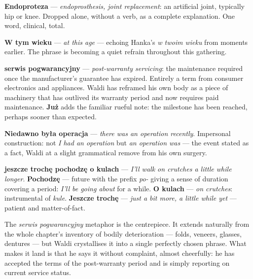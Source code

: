 
\textbf{Endoproteza} --- \textit{endoprosthesis, joint replacement}: an
artificial joint, typically hip or knee. Dropped alone, without a verb,
as a complete explanation. One word, clinical, total.

\textbf{W tym wieku} --- \textit{at this age} --- echoing Hanka's
\textit{w twoim wieku} from moments earlier. The phrase is becoming a
quiet refrain throughout this gathering.

\textbf{serwis pogwarancyjny} --- \textit{post-warranty servicing}: the
maintenance required once the manufacturer's guarantee has expired.
Entirely a term from consumer electronics and appliances. Waldi has
reframed his own body as a piece of machinery that has outlived its
warranty period and now requires paid maintenance. \textbf{Już} adds
the familiar rueful note: the milestone has been reached, perhaps
sooner than expected.

\textbf{Niedawno była operacja} --- \textit{there was an operation
recently}. Impersonal construction: not \textit{I had an operation} but
\textit{an operation was} --- the event stated as a fact, Waldi at a
slight grammatical remove from his own surgery.

\textbf{jeszcze trochę pochodzę o kulach} --- \textit{I'll walk on
crutches a little while longer}. \textbf{Pochodzę} --- future with the
prefix \textit{po-} giving a sense of duration covering a period:
\textit{I'll be going about} for a while. \textbf{O kulach} ---
\textit{on crutches}: instrumental of \textit{kule}. \textbf{Jeszcze
trochę} --- \textit{just a bit more, a little while yet} --- patient
and matter-of-fact.

The \textit{serwis pogwarancyjny} metaphor is the centrepiece. It
extends naturally from the whole chapter's inventory of bodily
deterioration --- folds, veneers, glasses, dentures --- but Waldi
crystallises it into a single perfectly chosen phrase. What makes it
land is that he says it without complaint, almost cheerfully: he has
accepted the terms of the post-warranty period and is simply reporting
on current service status.


